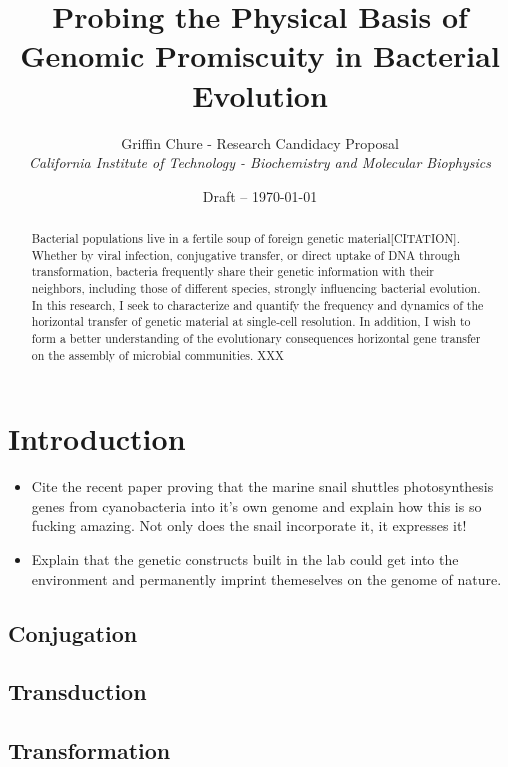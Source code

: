 

\title{Probing the Physical Basis of Genomic Promiscuity in Bacterial Evolution}
\author{Griffin Chure - Research Candidacy Proposal\\
	\textit{California Institute of Technology - Biochemistry and Molecular
	Biophysics}}
\date{Draft -- \today}


\maketitle
\begin{abstract}
	Bacterial populations live in a fertile soup of foreign genetic
	material[CITATION]. Whether by viral infection, conjugative transfer, or
	direct uptake of DNA through transformation, bacteria frequently share
	their genetic information with their neighbors, including those of
	different species, strongly influencing bacterial evolution. In this
	research, I seek to characterize and quantify the frequency and dynamics
	of the horizontal transfer of genetic material at single-cell
	resolution. In addition, I wish to form a better understanding of the
	evolutionary consequences horizontal gene transfer on the assembly of
	microbial communities. XXX
\end{abstract}

\section*{Introduction}
\begin{itemize}
	\item Cite the recent paper proving that the marine snail shuttles
		photosynthesis genes from cyanobacteria into it's own genome and
		explain how this is so fucking amazing. Not only does the snail
		incorporate it, it expresses it!
	\item Explain that the genetic constructs built in the lab could get
		into the environment and permanently imprint themeselves on the
		genome of nature. 
\end{itemize}
\subsection*{Conjugation}
\subsection*{Transduction}
\subsection*{Transformation}
